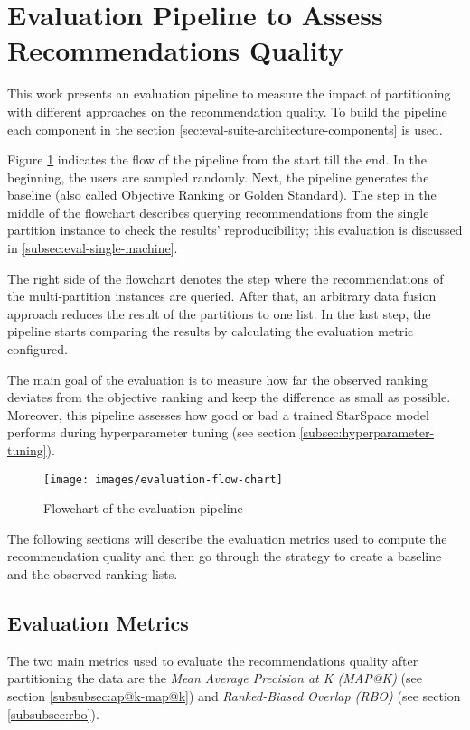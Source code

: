 \section{Evaluation Pipeline to Assess Recommendations Quality}
\label{sec:evaluation-pipeline}
This work presents an evaluation pipeline to measure the impact of partitioning with different approaches on the recommendation quality. To build the pipeline each component in the section \ref{sec:eval-suite-architecture-components} is used. 

Figure \ref{fig:flowchart-evaluation-pipeline} indicates the flow of the pipeline from the start till the end. In the beginning, the users are sampled randomly. Next, the pipeline generates the baseline (also called Objective Ranking or Golden Standard). The step in the middle of the flowchart describes querying recommendations from the single partition instance to check the results' reproducibility; this evaluation is discussed in \ref{subsec:eval-single-machine}. 


The right side of the flowchart denotes the step where the recommendations of the multi-partition instances are queried. After that, an arbitrary data fusion approach reduces the result of the partitions to one list. In the last step, the pipeline starts comparing the results by calculating the evaluation metric configured. 

The main goal of the evaluation is to measure how far the observed ranking deviates from the objective ranking and keep the difference as small as possible. Moreover, this pipeline assesses how good or bad a trained StarSpace model performs during hyperparameter tuning (see section \ref{subsec:hyperparameter-tuning}).

\begin{figure}[!htb]
    \centering
    \texttt{[image: images/evaluation-flow-chart]}
    \caption{Flowchart of the evaluation pipeline}
    \label{fig:flowchart-evaluation-pipeline}
\end{figure}

The following sections will describe the evaluation metrics used to compute the recommendation quality and then go through the strategy to create a baseline and the observed ranking lists.

\subsection{Evaluation Metrics}
\label{subsec:evaluation-metrics-for-recommendation-quality}
The two main metrics used to evaluate the recommendations quality after partitioning the data are the \emph{Mean Average Precision at K (MAP@K)} (see section \ref{subsubsec:ap@k-map@k})  and \emph{Ranked-Biased Overlap (RBO)} (see section \ref{subsubsec:rbo}). 


